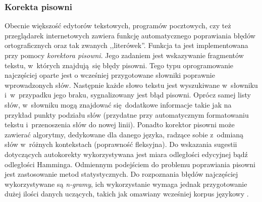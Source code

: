 \documentclass[a4paper, twoside, openright, 12pt]{report}
\begin{document}
            \subsubsection{Korekta pisowni}
                Obecnie większość edytorów tekstowych, programów pocztowych, czy też przeglądarek internetowych zawiera
                funkcję automatycznego poprawiania błędów ortograficznych
                oraz tak zwanych ,,literówek''. Funkcja ta jest implementowana przy pomocy \emph{korektora pisowni}. Jego
                zadaniem jest wskazywanie fragmentów tekstu, w~których znajdują się błędy pisowni. Tego typu oprogramowanie
                najczęściej oparte jest o wcześniej przygotowane słowniki poprawnie wprowadzonych słów. Następnie każde
                słowo tekstu jest wyszukiwane w~słowniku i~w~przypadku jego braku, sygnalizowany jest błąd pisowni. Oprócz
                samej listy słów, w~słowniku mogą znajdować się dodatkowe informacje takie jak na przykład punkty podziału
                słów (przydatne przy automatycznym formatowaniu tekstu i~przenoszenia słów do nowej linii). Ponadto korektor
                pisowni może zawierać algorytmy, dedykowane dla danego języka, radzące sobie z~odmianą słów w~różnych
                kontekstach (poprawność fleksyjna). Do wskazania sugestii dotyczących autokorekty wykorzystywana jest miara
                odległości edycyjnej bądź odległości Hamminga. Odmiennym podejściem do problemu poprawiania pisowni jest zastosowanie
                metod statystycznych. Do rozpoznania błędów najczęściej wykorzystywane są \emph{n-gramy}, ich wykorzystanie
                wymaga jednak przygotowanie dużej ilości danych uczących, takich jak omawiany wcześniej korpus językowy
                \cite{SPELLCHECKING}.
\end{document}
